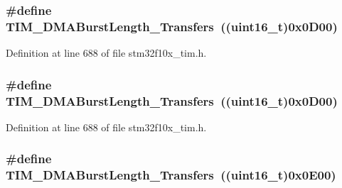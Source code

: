 \subsubsection[{\texorpdfstring{T\+I\+M\+\_\+\+D\+M\+A\+Burst\+Length\+\_\+14\+Transfers}{TIM_DMABurstLength_14Transfers}}]{\setlength{\rightskip}{0pt plus 5cm}\#define T\+I\+M\+\_\+\+D\+M\+A\+Burst\+Length\+\_\+Transfers~(({\bf uint16\+\_\+t})0x0\+D00)}\hypertarget{group___t_i_m___d_m_a___burst___length_gab1a097ca7404e518839df99795443fb0}{}\label{group___t_i_m___d_m_a___burst___length_gab1a097ca7404e518839df99795443fb0}


Definition at line 688 of file stm32f10x\+\_\+tim.\+h.

\subsubsection[{\texorpdfstring{T\+I\+M\+\_\+\+D\+M\+A\+Burst\+Length\+\_\+14\+Transfers}{TIM_DMABurstLength_14Transfers}}]{\setlength{\rightskip}{0pt plus 5cm}\#define T\+I\+M\+\_\+\+D\+M\+A\+Burst\+Length\+\_\+Transfers~(({\bf uint16\+\_\+t})0x0\+D00)}\hypertarget{group___t_i_m___d_m_a___burst___length_gab1a097ca7404e518839df99795443fb0}{}\label{group___t_i_m___d_m_a___burst___length_gab1a097ca7404e518839df99795443fb0}


Definition at line 688 of file stm32f10x\+\_\+tim.\+h.

\subsubsection[{\texorpdfstring{T\+I\+M\+\_\+\+D\+M\+A\+Burst\+Length\+\_\+15\+Transfers}{TIM_DMABurstLength_15Transfers}}]{\setlength{\rightskip}{0pt plus 5cm}\#define T\+I\+M\+\_\+\+D\+M\+A\+Burst\+Length\+\_\+Transfers~(({\bf uint16\+\_\+t})0x0\+E00)}\hypertarget{group___t_i_m___d_m_a___burst___length_gad13373f5fd246557a4fc487dc43c37ec}{}\label{group___t_i_m___d_m_a___burst___length_gad13373f5fd246557a4fc487dc43c37ec}


